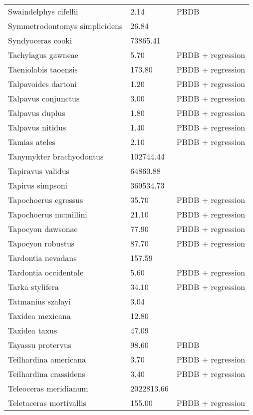 \documentclass{article}
\begin{document}
\begin{center}
\begin{longtable}{p{} p{} p{}}
    Swaindelphys cifellii & 2.14 & PBDB \\ 
    Symmetrodontomys simplicidens & 26.84 & \cite{Tomiya2013} \\ 
    Syndyoceras cooki & 73865.41 & \cite{Tomiya2013} \\ 
    Tachylagus gawneae & 5.70 & PBDB + regression \\ 
    Taeniolabis taoensis & 173.80 & PBDB + regression \\ 
    Talpavoides dartoni & 1.20 & PBDB + regression \\ 
    Talpavus conjunctus & 3.00 & PBDB + regression \\ 
    Talpavus duplus & 1.80 & PBDB + regression \\ 
    Talpavus nitidus & 1.40 & PBDB + regression \\ 
    Tamias ateles & 2.10 & PBDB + regression \\ 
    Tanymykter brachyodontus & 102744.44 & \cite{Tomiya2013} \\ 
    Tapiravus validus & 64860.88 & \cite{Tomiya2013} \\ 
    Tapirus simpsoni & 369534.73 & \cite{Tomiya2013} \\ 
    Tapochoerus egressus & 35.70 & PBDB + regression \\ 
    Tapochoerus mcmillini & 21.10 & PBDB + regression \\ 
    Tapocyon dawsonae & 77.90 & PBDB + regression \\ 
    Tapocyon robustus & 87.70 & PBDB + regression \\ 
    Tardontia nevadans & 157.59 & \cite{Tomiya2013} \\ 
    Tardontia occidentale & 5.60 & PBDB + regression \\ 
    Tarka stylifera & 34.10 & PBDB + regression \\ 
    Tatmanius szalayi & 3.04 & \cite{Ferrusquia-Villafranca2006} \\ 
    Taxidea mexicana & 12.80 & \cite{Bloch2007} \\ 
    Taxidea taxus & 47.09 & \cite{Smith2004} \\ 
    Tayassu protervus & 98.60 & PBDB \\ 
    Teilhardina americana & 3.70 & PBDB + regression \\ 
    Teilhardina crassidens & 3.40 & PBDB + regression \\ 
    Teleoceras meridianum & 2022813.66 & \cite{Tomiya2013} \\ 
    Teletaceras mortivallis & 155.00 & PBDB + regression \\ 

\end{longtable}
\end{center}
\end{document}

